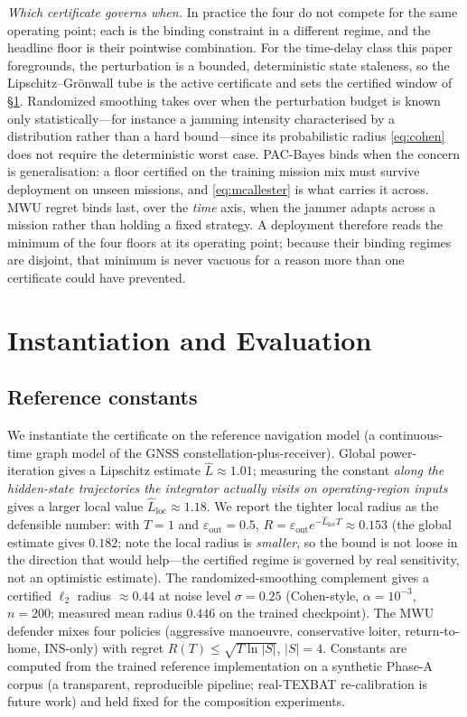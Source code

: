 \documentclass[conference]{IEEEtran}
\begin{document}
\emph{Which certificate governs when.} In practice the four do not compete for
the same operating point; each is the binding constraint in a different regime,
and the headline floor is their pointwise combination. For the time-delay class
this paper foregrounds, the perturbation is a bounded, deterministic state
staleness, so the Lipschitz--Grönwall tube is the active certificate and sets
the certified window of \S\ref{sec:instantiation}. Randomized smoothing takes
over when the perturbation budget is known only statistically---for instance a
jamming intensity characterised by a distribution rather than a hard bound---since
its probabilistic radius \eqref{eq:cohen} does not require the deterministic
worst case. PAC-Bayes binds when the concern is generalisation: a floor certified
on the training mission mix must survive deployment on unseen missions, and
\eqref{eq:mcallester} is what carries it across. MWU regret binds last, over the
\emph{time} axis, when the jammer adapts across a mission rather than holding a
fixed strategy. A deployment therefore reads the minimum of the four floors at
its operating point; because their binding regimes are disjoint, that minimum is
never vacuous for a reason more than one certificate could have prevented.

\section{Instantiation and Evaluation}
\label{sec:instantiation}
\subsection{Reference constants}
We instantiate the certificate on the reference navigation model (a
continuous-time graph model of the GNSS constellation-plus-receiver). Global
power-iteration gives a Lipschitz estimate $\hat L \approx 1.01$; measuring the
constant \emph{along the hidden-state trajectories the integrator actually
visits on operating-region inputs} gives a larger local value
$\hat L_{\text{loc}} \approx 1.18$. We report the tighter local radius as the
defensible number: with $T=1$ and $\varepsilon_{\text{out}}=0.5$,
$R = \varepsilon_{\text{out}} e^{-\hat L_{\text{loc}} T}\approx 0.153$ (the
global estimate gives $0.182$; note the local radius is \emph{smaller}, so the
bound is not loose in the direction that would help---the certified regime is
governed by real sensitivity, not an optimistic estimate). The
randomized-smoothing complement gives a certified $\ell_2$ radius $\approx 0.44$
at noise level $\sigma=0.25$ (Cohen-style, $\alpha=10^{-3}$, $n=200$; measured
mean radius $0.446$ on the trained checkpoint). The MWU defender mixes four
policies (aggressive manoeuvre, conservative loiter, return-to-home, INS-only)
with regret $R(T)\le\sqrt{T\ln|S|}$, $|S|=4$. Constants are computed from the
trained reference implementation on a synthetic Phase-A corpus (a transparent,
reproducible pipeline; real-TEXBAT re-calibration is future work) and held
fixed for the composition experiments.
\end{document}

